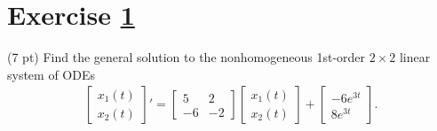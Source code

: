 \newpage



%
%
%
%


\section{Exercise \ref{sec : Math211 Summer2019 Exam4 Q7}}
\label{sec : Math211 Summer2019 Exam4 Q7}

(7 pt) Find the general solution to the nonhomogeneous 1st-order $2 \times 2$ linear system of ODEs
\begin{align}
\begin{bmatrix}%
x_{1}(t)	\\
x_{2}(t)
\end{bmatrix}%
'
=
\begin{bmatrix}%
5	&	2	\\
-6	&	-2
\end{bmatrix}%
\begin{bmatrix}%
x_{1}(t)	\\
x_{2}(t)
\end{bmatrix}%
+
\begin{bmatrix}%
-6 e^{3 t}	\\
8 e^{3 t}
\end{bmatrix}%
.%
\label{eq : E4Q7 ODE}
\end{align}



